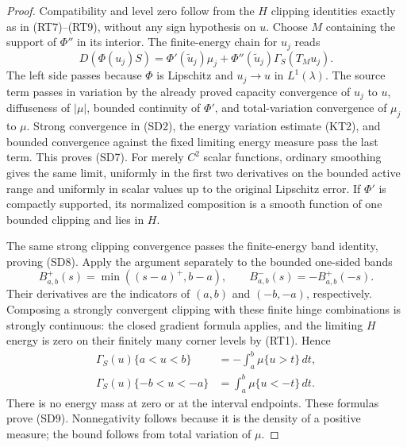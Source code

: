 \begin{proof}
Compatibility and level zero follow from the $H$ clipping
identities exactly as in (RT7)--(RT9), without any sign
hypothesis on $u$.  Choose $M$ containing the support of
$\Phi''$ in its interior.  The finite-energy chain for $u_j$
reads
\[
 D(\Phi(u_j)S)=\Phi'(\widetilde u_j)\mu_j
                         +\Phi''(\widetilde u_j)\Gamma_S(T_Mu_j).
\]
The left side passes because $\Phi$ is Lipschitz and
$u_j\to u$ in $L^1(\lambda)$.  The source term passes in
variation by the already proved capacity convergence of $u_j$
to $u$, diffuseness of $|\mu|$, bounded continuity of $\Phi'$, and
total-variation convergence of $\mu_j$ to $\mu$.
Strong convergence in (SD2), the energy variation estimate
(KT2), and bounded convergence against the fixed limiting
energy measure pass the last term.  This proves (SD7).
For merely $C^2$ scalar functions, ordinary smoothing gives
the same limit, uniformly in the first two derivatives on
the bounded active range and uniformly in scalar values
up to the original Lipschitz error.
If $\Phi'$ is compactly supported, its normalized composition
is a smooth function of one bounded clipping and lies in $H$.

The same strong clipping convergence passes the finite-energy
band identity, proving (SD8).  Apply the argument separately
to the bounded one-sided bands
\[
 B^+_{a,b}(s)=\min((s-a)^+,b-a),\qquad
 B^-_{a,b}(s)=-B^+_{a,b}(-s).
\]
Their derivatives are the indicators of $(a,b)$ and
$(-b,-a)$, respectively.  Composing a strongly convergent
clipping with these finite hinge combinations is strongly
continuous: the closed gradient formula applies, and the
limiting $H$ energy is zero on their finitely many corner
levels by (RT1).  Hence
\[
 \begin{split}
 \Gamma_S(u)\{a<u<b\}&=-\int_a^b\mu\{u>t\}\,dt,\\
 \Gamma_S(u)\{-b<u<-a\}&=\int_a^b\mu\{u<-t\}\,dt.
 \end{split}
\]
There is no energy mass at zero or at the interval endpoints.
These formulas prove (SD9).  Nonnegativity follows because
it is the density of a positive measure; the bound follows
from total variation of $\mu$.
\end{proof}

